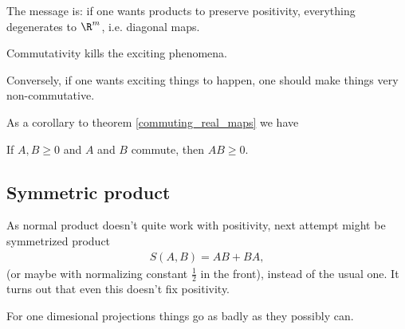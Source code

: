 The message is: if one wants products to preserve positivity, everything degenerates to $\R^{m}$, i.e. diagonal maps.

\begin{phil}
	Commutativity kills the exciting phenomena.
\end{phil}

Conversely, if one wants exciting things to happen, one should make things very non-commutative.

As a corollary to theorem \ref{commuting_real_maps} we have

\begin{kor}
	If $A, B \geq 0$ and $A$ and $B$ commute, then $AB \geq 0$.
\end{kor}

\subsection{Symmetric product}

As normal product doesn't quite work with positivity, next attempt might be symmetrized product
\begin{align*}
	S(A, B) = AB + BA,
\end{align*}
(or maybe with normalizing constant $\frac{1}{2}$ in the front), instead of the usual one. It turns out that even this doesn't fix positivity.

For one dimesional projections things go as badly as they possibly can.

